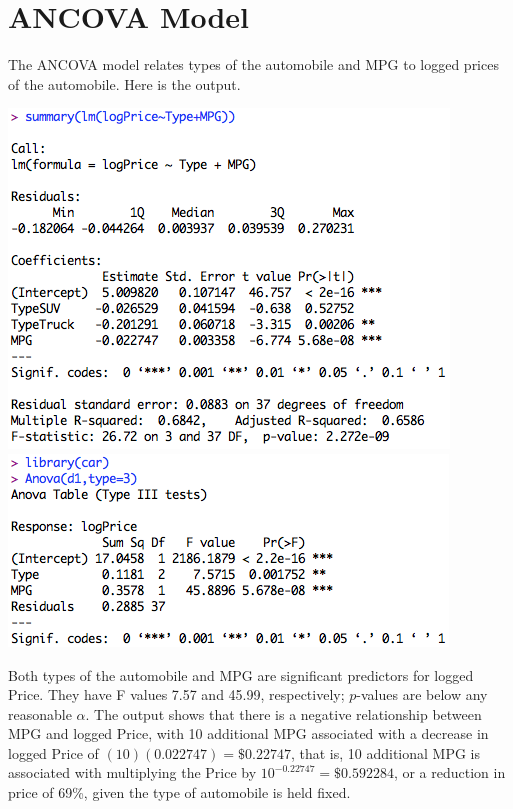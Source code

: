 \documentclass[a4 paper, 11 pt]{article}
\begin{document}
\section{ANCOVA Model}
The ANCOVA model relates types of the automobile and MPG to logged prices of the automobile. Here is the output.
\begin{center}
\includegraphics[scale=0.5]{d1lm}\\
\includegraphics[scale=0.5]{d1ls}
\end{center}
Both types of the automobile and MPG are significant predictors for logged Price. They have F values 7.57 and 45.99, respectively; $p$-values are below any reasonable $\alpha$. The output shows that there is a negative relationship between MPG and logged Price, with 10 additional MPG associated with a decrease in logged Price of $(10)(0.022747) = \$0.22747$, that is, 10 additional MPG is associated with multiplying the Price by $10^{-0.22747} = \$0.592284$, or a reduction in price of 69\%, given the type of automobile is held fixed.
\end{document}
